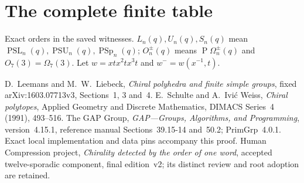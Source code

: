 \documentclass[10pt,a4paper]{article}
\begin{document}
\section{The complete finite table}
\begin{table}[h]
\centering\small

\caption{Exact orders in the saved witnesses. $L_n(q),U_n(q),S_n(q)$ mean
$\operatorname{PSL}_n(q),\operatorname{PSU}_n(q),\operatorname{PSp}_n(q)$;
$O_n^\pm(q)$ means $\operatorname{P}\Omega_n^\pm(q)$ and
$O_7(3)=\Omega_7(3)$. Let $w=xtx^2tx^3t$ and $w^-=w(x^{-1},t)$.}
\label{table}
\end{table}
\begin{thebibliography}{9}\small
{} D.~Leemans and M.~W.~Liebeck, \emph{Chiral polyhedra and finite
simple groups}, fixed arXiv:1603.07713v3, Sections~1, 3 and~4.
 E.~Schulte and A.~Ivi\'c Weiss, \emph{Chiral polytopes},
Applied Geometry and Discrete Mathematics, DIMACS Series~4 (1991), 493--516.
 The GAP Group, \emph{GAP---Groups, Algorithms, and Programming},
version~4.15.1, reference manual Sections~39.15-14 and~50.2;
PrimGrp~4.0.1. Exact local implementation and data pins accompany this proof.
 Human Compression project, \emph{Chirality detected by the
order of one word}, accepted twelve-sporadic component, final edition~v2;
its distinct review and root adoption are retained.
\end{thebibliography}
\end{document}

